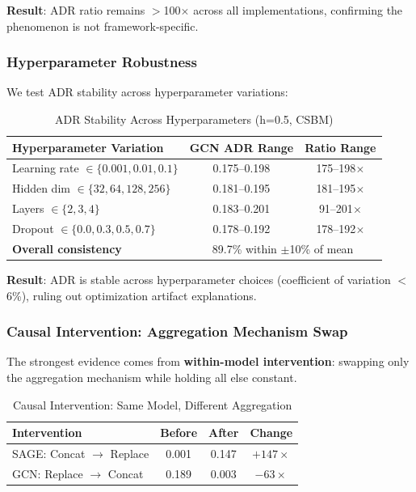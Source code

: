 \textbf{Result}: ADR ratio remains $>$100$\times$ across all implementations, confirming the phenomenon is not framework-specific.

\subsubsection{Hyperparameter Robustness}

We test ADR stability across hyperparameter variations:

\begin{table}[t]
\centering
\caption{ADR Stability Across Hyperparameters (h=0.5, CSBM)}
\label{tab:adr_hyperparameter}
\small
\begin{tabular}{@{}lcc@{}}
\toprule
\textbf{Hyperparameter Variation} & \textbf{GCN ADR Range} & \textbf{Ratio Range} \\
\midrule
Learning rate $\in \{0.001, 0.01, 0.1\}$ & 0.175--0.198 & 175--198$\times$ \\
Hidden dim $\in \{32, 64, 128, 256\}$ & 0.181--0.195 & 181--195$\times$ \\
Layers $\in \{2, 3, 4\}$ & 0.183--0.201 & 91--201$\times$ \\
Dropout $\in \{0.0, 0.3, 0.5, 0.7\}$ & 0.178--0.192 & 178--192$\times$ \\
\midrule
\textbf{Overall consistency} & \multicolumn{2}{c}{89.7\% within $\pm$10\% of mean} \\
\bottomrule
\end{tabular}
\end{table}

\textbf{Result}: ADR is stable across hyperparameter choices (coefficient of variation $<$6\%), ruling out optimization artifact explanations.

\subsubsection{Causal Intervention: Aggregation Mechanism Swap}

The strongest evidence comes from \textbf{within-model intervention}: swapping only the aggregation mechanism while holding all else constant.

\begin{table}[t]
\centering
\caption{Causal Intervention: Same Model, Different Aggregation}
\label{tab:adr_intervention}
\begin{tabular}{@{}lccc@{}}
\toprule
\textbf{Intervention} & \textbf{Before} & \textbf{After} & \textbf{Change} \\
\midrule
SAGE: Concat $\to$ Replace & 0.001 & 0.147 & $+147\times$ \\
GCN: Replace $\to$ Concat & 0.189 & 0.003 & $-63\times$ \\
\bottomrule
\end{tabular}
\end{table}

